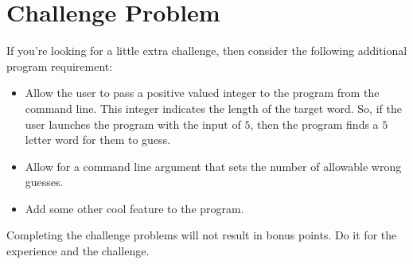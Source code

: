 \documentclass[]{tufte-handout}
\begin{document}
\section{Challenge Problem}

If you're looking for a little extra challenge, then consider the following additional program requirement:
\begin{itemize}
\item Allow the user to pass a positive valued integer to the program from the command line.  This integer indicates the length of the target word. So, if the user launches the program with the input of $5$, then the program finds a $5$ letter word for them to guess. 
\item Allow for a command line argument that sets the number of allowable wrong guesses.  
\item Add some other cool feature to the program.
\end{itemize}
Completing the challenge problems will not result in bonus points. Do it for the experience and the challenge. 
\end{document}
